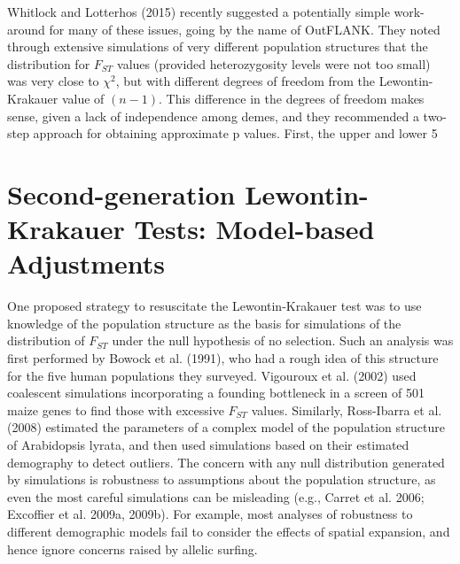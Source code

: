 \documentclass{article}
\begin{document}
Whitlock and Lotterhos (2015) recently suggested a potentially simple work-around for many of these issues, going by the name of OutFLANK. They noted through extensive simulations of very different population structures that the distribution for  $ F_{ST} $ values (provided heterozygosity levels were not too small) was very close to  $ \chi^{2} $, but with different degrees of freedom from the Lewontin-Krakauer value of  $ (n-1) $. This difference in the degrees of freedom makes sense, given a lack of independence among demes, and they recommended a two-step approach for obtaining approximate p values. First, the upper and lower 5%

\section{Second-generation Lewontin-Krakauer Tests: Model-based Adjustments}
One proposed strategy to resuscitate the Lewontin-Krakauer test was to use knowledge of the population structure as the basis for simulations of the distribution of  $ F_{ST} $ under the null hypothesis of no selection. Such an analysis was first performed by Bowock et al. (1991), who had a rough idea of this structure for the five human populations they surveyed. Vigouroux et al. (2002) used coalescent simulations incorporating a founding bottleneck in a screen of 501 maize genes to find those with excessive  $ F_{ST} $ values. Similarly, Ross-Ibarra et al. (2008) estimated the parameters of a complex model of the population structure of Arabidopsis lyrata, and then used simulations based on their estimated demography to detect outliers. The concern with any null distribution generated by simulations is robustness to assumptions about the population structure, as even the most careful simulations can be misleading (e.g., Carret et al. 2006; Excoffier et al. 2009a, 2009b). For example, most analyses of robustness to different demographic models fail to consider the effects of spatial expansion, and hence ignore concerns raised by allelic surfing.
\end{document}
